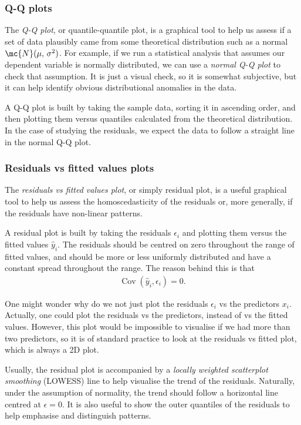 \subsubsection{Q-Q plots}\label{sec:diag-qqplot}
The \emph{Q-Q plot}, or quantile-quantile plot, is a graphical tool to help us assess if a set of data plausibly came from some theoretical distribution such as a normal $\mc{N}(\mu, \, \sigma^{2})$. For example, if we run a statistical analysis that assumes our dependent variable is normally distributed, we can use a \emph{normal Q-Q plot} to check that assumption. It is just a visual check, so it is somewhat subjective, but it can help identify obvious distributional anomalies in the data.

A Q-Q plot is built by taking the sample data, sorting it in ascending order, and then plotting them versus quantiles calculated from the theoretical distribution. In the case of studying the residuals, we expect the data to follow a straight line in the normal Q-Q plot.

\subsubsection{Residuals vs fitted values plots}\label{sec:diag-resid-vs-fitted}
The \emph{residuals vs fitted values plot}, or simply residual plot, is a useful graphical tool to help us assess the homoscedasticity of the residuals or, more generally, if the residuals have non-linear patterns.

A residual plot is built by taking the residuals $\epsilon_{i}$ and plotting them versus the fitted values $\hat{y}_{i}$. The residuals should be centred on zero throughout the range of fitted values, and should be more or less uniformly distributed and have a constant spread throughout the range. The reason behind this is that
\begin{align}
	\operatorname{Cov}(\hat{y}_{i}, \epsilon_{i}) = 0.
\end{align}

One might wonder why do we not just plot the residuals $\epsilon_{i}$ vs the predictors $x_{i}$. Actually, one could plot the residuals vs the predictors, instead of vs the fitted values. However, this plot would be impossible to visualise if we had more than two predictors, so it is of standard practice to look at the residuals vs fitted plot, which is always a 2D plot.

Usually, the residual plot is accompanied by a \emph{locally weighted scatterplot smoothing} (LOWESS) line to help visualise the trend of the residuals. Naturally, under the assumption of normality, the trend should follow a horizontal line centred at $\epsilon = 0$. It is also useful to show the outer quantiles of the residuals to help emphasise and distinguish patterns.

